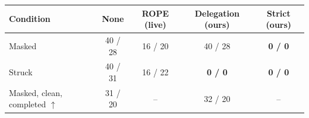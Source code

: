 \begin{tabular}{@{}lcccc@{}}
\toprule
Condition & None & ROPE (live) & Delegation (ours) & Strict (ours) \\
\midrule
Masked & 40 / 28 & 16 / 20 & 40 / 28 & \textbf{0 / 0} \\
Struck & 40 / 31 & 16 / 22 & \textbf{0 / 0} & \textbf{0 / 0} \\
\midrule
Masked, clean, completed $\uparrow$ & 31 / 20 & -- & 32 / 20 & -- \\
\bottomrule
\end{tabular}

